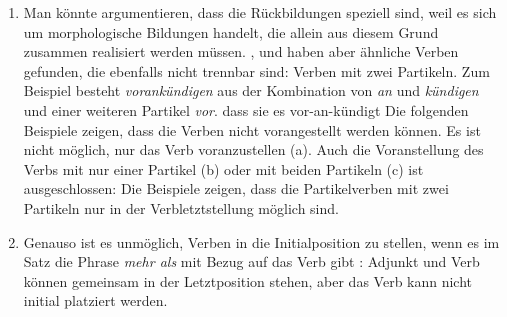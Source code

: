 \begin{enumerate}
\item Man könnte argumentieren, dass die Rückbildungen speziell sind, weil es sich um morphologische
  Bildungen handelt, die allein aus diesem Grund zusammen realisiert werden müssen. \textcites[]{Haider93a}[--60]{Haider2010a},
\citet[]{Vikner2001a} und \citet{Fortmann2007a} haben
aber ähnliche Verben gefunden, die ebenfalls nicht trennbar sind: Verben mit zwei Partikeln. Zum
Beispiel besteht \emph{vorankündigen} aus der Kombination von \emph{an} und \emph{kündigen} und
einer weiteren Partikel \emph{vor}.
\ea 
\label{ex-dass-sie-es-vorankündigt}
dass sie es vor-an-kündigt
\z
Die folgenden Beispiele zeigen, dass die Verben nicht vorangestellt werden können. Es ist nicht
möglich, nur das Verb voranzustellen (a). Auch die Voranstellung des Verbs mit nur einer
Partikel (b) oder mit beiden Partikeln (c) ist ausgeschlossen:
\eal
{}
\zl
Die Beispiele zeigen, dass die Partikelverben mit zwei Partikeln nur in der Verbletztstellung
möglich sind.

\item Genauso ist es unmöglich, Verben in die Initialposition zu stellen, wenn es im Satz die Phrase
  \emph{mehr als} mit Bezug auf das Verb gibt \parencites[Abschnitt~3.1]{Haider97c}[]{Meinunger2001a}: 
\eal
{}
\zl
%
Adjunkt und Verb können gemeinsam in der Letztposition stehen, aber das Verb kann nicht initial
platziert werden.
\largerpage


\end{enumerate}
